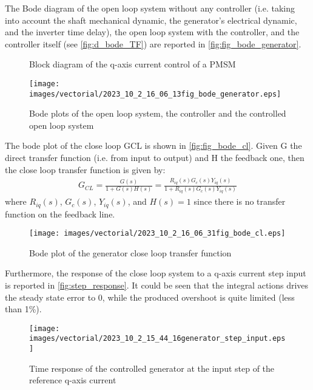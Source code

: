  The Bode diagram of the open loop system without any controller (i.e. taking into account the shaft mechanical dynamic, the generator's electrical dynamic, and the inverter time delay), the open loop system with the controller, and the controller itself (see \autoref{fig:d_bode_TF}) are reported in \autoref{fig:fig_bode_generator}.
  \begin{figure}[htb]
    
    \caption{Block diagram of the q-axis current control of a PMSM}
    \label{fig:d_bode_TF}
  \end{figure}
  \begin{figure}[htb]
    \centering
    \texttt{[image: images/vectorial/2023\_10\_2\_16\_06\_13fig\_bode\_generator.eps]}
    \caption{Bode plots of the open loop system, the controller and the controlled open loop system}
    \label{fig:fig_bode_generator}
   \end{figure}
  
 The bode plot of the close loop \acrshort{GCL} is shown in \autoref{fig:fig_bode_cl}. Given \acrshort{G} the direct transfer function (i.e. from input to output) and \acrshort{H} the feedback one, then the close loop transfer function is given by:
 \begin{gather}
     G_{CL}=\frac{G(s)}{1+G(s)H(s)}=\frac{R_{iq}(s)G_c(s)Y_{iq}(s)}{1+R_{iq}(s)G_c(s)Y_{iq}(s)}
     \label{eq:close_loop_TF}
 \end{gather}
 where $R_{iq}(s)$, $G_c(s)$, $Y_{iq}(s)$, and $H(s)=1$ since there is no transfer function on the feedback line.
 

 \begin{figure}[htb]
    \centering
    \texttt{[image: images/vectorial/2023\_10\_2\_16\_06\_31fig\_bode\_cl.eps]}
    \caption{Bode plot of the generator close loop transfer function}
    \label{fig:fig_bode_cl}
 \end{figure}

Furthermore, the response of the close loop system to a q-axis current step input is reported in \autoref{fig:step_response}. It could be seen that the integral actions drives the steady state error to 0, while the produced overshoot is quite limited (less than 1\%). 

\begin{figure}[htb]
  \centering
  \texttt{[image: images/vectorial/2023\_10\_2\_15\_44\_16generator\_step\_input.eps]}
  \caption{Time response of the controlled generator at the input step of the reference q-axis current}
  \label{fig:step_response}
\end{figure}


